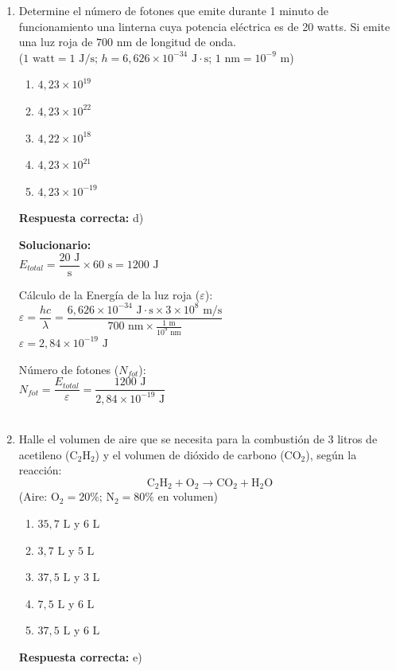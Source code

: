 \begin{enumerate}
	\vspace{6mm}
	
	\item Determine el número de fotones que emite durante 1 minuto de funcionamiento una linterna cuya potencia eléctrica es de 20 watts. Si emite una luz roja de $700\text{ nm}$ de longitud de onda.\\
	($1\text{ watt} = 1\text{ J/s}$; $h = 6,626 \times 10^{-34}\text{ J}\cdot\text{s}$; $1\text{ nm} = 10^{-9}\text{ m}$)
	\begin{enumerate}[label=\alph*)]
		\item $4,23 \times 10^{19}$
		\item $4,23 \times 10^{22}$
		\item $4,22 \times 10^{18}$
		\item $4,23 \times 10^{21}$
		\item $4,23 \times 10^{-19}$
	\end{enumerate}
	\textbf{Respuesta correcta:} d)
	
	\vspace{2mm}
	\textbf{Solucionario:}\\
	
	$E_{total} = \dfrac{20\text{ J}}{\text{s}} \times 60\text{ s} = 1200\text{ J}$
	
	Cálculo de la Energía de la luz roja ($\varepsilon$):\\
	
	$ \varepsilon = \dfrac{hc}{\lambda} = \dfrac{6,626 \times 10^{-34}\text{ J}\cdot\text{s} \times 3 \times 10^8\text{ m/s}}{700\text{ nm} \times \frac{1\text{ m}}{10^9\text{ nm}}} $\\
	$ \varepsilon = 2,84 \times 10^{-19}\text{ J} $
	
	Número de fotones ($N_{fot}$):\\
	
	$ N_{fot} = \dfrac{E_{total}}{\varepsilon} = \dfrac{1200\text{ J}}{2,84 \times 10^{-19}\text{ J}} $\\
	
	\\
	
	\vspace{6mm}
	
	\item Halle el volumen de aire que se necesita para la combustión de 3 litros de acetileno ($\text{C}_2\text{H}_2$) y el volumen de dióxido de carbono ($\text{CO}_2$), según la reacción:
	\[ \text{C}_2\text{H}_2 + \text{O}_2 \rightarrow \text{CO}_2 + \text{H}_2\text{O} \]
	(Aire: $\text{O}_2 = 20\%$; $\text{N}_2 = 80\%$ en volumen)
	\begin{enumerate}[label=\alph*)]
		\item $35,7\text{ L}$ y $6\text{ L}$
		\item $3,7\text{ L}$ y $5\text{ L}$
		\item $37,5\text{ L}$ y $3\text{ L}$
		\item $7,5\text{ L}$ y $6\text{ L}$
		\item $37,5\text{ L}$ y $6\text{ L}$
	\end{enumerate}
	\textbf{Respuesta correcta:} e)
	

\end{enumerate}
